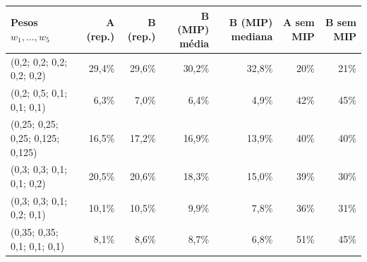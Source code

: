 \begin{tabular}{lrrrrrr}
\toprule
Pesos $w_1,\ldots,w_5$ & A (rep.) & B (rep.) & B (MIP) média & B (MIP) mediana & A sem MIP & B sem MIP \\
\midrule
(0,2; 0,2; 0,2; 0,2; 0,2) & 29,4\% & 29,6\% & 30,2\% & 32,8\% & 20\% & 21\% \\
(0,2; 0,5; 0,1; 0,1; 0,1) & 6,3\% & 7,0\% & 6,4\% & 4,9\% & 42\% & 45\% \\
(0,25; 0,25; 0,25; 0,125; 0,125) & 16,5\% & 17,2\% & 16,9\% & 13,9\% & 40\% & 40\% \\
(0,3; 0,3; 0,1; 0,1; 0,2) & 20,5\% & 20,6\% & 18,3\% & 15,0\% & 39\% & 30\% \\
(0,3; 0,3; 0,1; 0,2; 0,1) & 10,1\% & 10,5\% & 9,9\% & 7,8\% & 36\% & 31\% \\
(0,35; 0,35; 0,1; 0,1; 0,1) & 8,1\% & 8,6\% & 8,7\% & 6,8\% & 51\% & 45\% \\
\bottomrule
\end{tabular}
